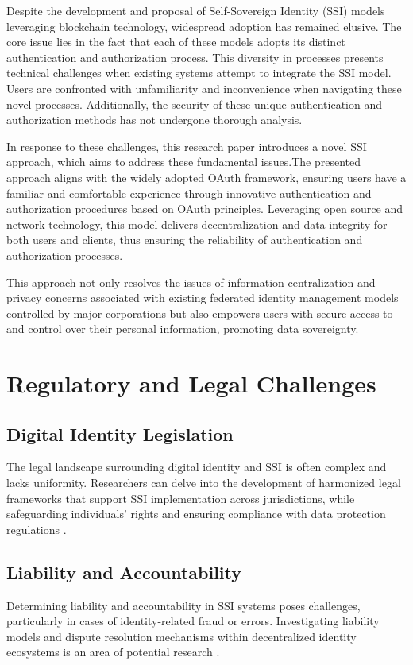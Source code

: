 Despite the development and proposal of Self-Sovereign Identity (SSI) models leveraging blockchain technology, widespread adoption has remained elusive. The core issue lies in the fact that each of these models adopts its distinct authentication and authorization process. This diversity in processes presents technical challenges when existing systems attempt to integrate the SSI model. Users are confronted with unfamiliarity and inconvenience when navigating these novel processes. Additionally, the security of these unique authentication and authorization methods has not undergone thorough analysis.
\par
In response to these challenges, this research paper introduces a novel SSI approach, which aims to address these fundamental issues.The presented approach aligns with the widely adopted OAuth framework, ensuring users have a familiar and comfortable experience through innovative authentication and authorization procedures based on OAuth principles. Leveraging open source and network technology, this model delivers decentralization and data integrity for both users and clients, thus ensuring the reliability of authentication and authorization processes. 
\par
This approach not only resolves the issues of information centralization and privacy concerns associated with existing federated identity management models controlled by major corporations but also empowers users with secure access to and control over their personal information, promoting data sovereignty.



\section*{Regulatory and Legal Challenges}
\subsection*{Digital Identity Legislation} 
The legal landscape surrounding digital identity and SSI is often complex and lacks uniformity. Researchers can delve into the development of harmonized legal frameworks that support SSI implementation across jurisdictions, while safeguarding individuals' rights and ensuring compliance with data protection regulations \cite{504}.
\subsection*{Liability and Accountability} Determining liability and accountability in SSI systems poses challenges, particularly in cases of identity-related fraud or errors. Investigating liability models and dispute resolution mechanisms within decentralized identity ecosystems is an area of potential research \cite{505}.

